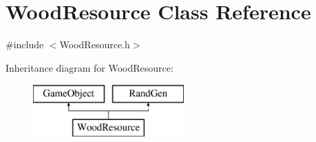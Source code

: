 \hypertarget{class_wood_resource}{}\section{Wood\+Resource Class Reference}
\label{class_wood_resource}


{\ttfamily \#include $<$Wood\+Resource.\+h$>$}

Inheritance diagram for Wood\+Resource\+:\begin{figure}[H]
\begin{center}
\leavevmode
\includegraphics[height=2.000000cm]{class_wood_resource}
\end{center}
\end{figure}
